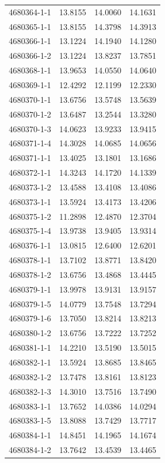 \begin{longtable}{lrrr}
4680364-1-1 & 13.8155 & 14.0060 & 14.1631 \\
4680365-1-1 & 13.8155 & 14.3798 & 14.3913 \\
4680366-1-1 & 13.1224 & 14.1940 & 14.1280 \\
4680366-1-2 & 13.1224 & 13.8237 & 13.7851 \\
4680368-1-1 & 13.9653 & 14.0550 & 14.0640 \\
4680369-1-1 & 12.4292 & 12.1199 & 12.2330 \\
4680370-1-1 & 13.6756 & 13.5748 & 13.5639 \\
4680370-1-2 & 13.6487 & 13.2544 & 13.3280 \\
4680370-1-3 & 14.0623 & 13.9233 & 13.9415 \\
4680371-1-4 & 14.3028 & 14.0685 & 14.0656 \\
4680371-1-1 & 13.4025 & 13.1801 & 13.1686 \\
4680372-1-1 & 14.3243 & 14.1720 & 14.1339 \\
4680373-1-2 & 13.4588 & 13.4108 & 13.4086 \\
4680373-1-1 & 13.5924 & 13.4173 & 13.4206 \\
4680375-1-2 & 11.2898 & 12.4870 & 12.3704 \\
4680375-1-4 & 13.9738 & 13.9405 & 13.9314 \\
4680376-1-1 & 13.0815 & 12.6400 & 12.6201 \\
4680378-1-1 & 13.7102 & 13.8771 & 13.8420 \\
4680378-1-2 & 13.6756 & 13.4868 & 13.4445 \\
4680379-1-1 & 13.9978 & 13.9131 & 13.9157 \\
4680379-1-5 & 14.0779 & 13.7548 & 13.7294 \\
4680379-1-6 & 13.7050 & 13.8214 & 13.8213 \\
4680380-1-2 & 13.6756 & 13.7222 & 13.7252 \\
4680381-1-1 & 14.2210 & 13.5190 & 13.5015 \\
4680382-1-1 & 13.5924 & 13.8685 & 13.8465 \\
4680382-1-2 & 13.7478 & 13.8161 & 13.8123 \\
4680382-1-3 & 14.3010 & 13.7516 & 13.7490 \\
4680383-1-1 & 13.7652 & 14.0386 & 14.0294 \\
4680383-1-5 & 13.8088 & 13.7429 & 13.7717 \\
4680384-1-1 & 14.8451 & 14.1965 & 14.1674 \\
4680384-1-2 & 13.7642 & 13.4539 & 13.4465 \\

\end{longtable}

